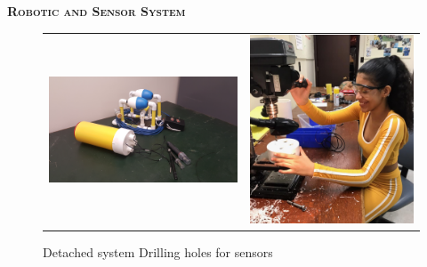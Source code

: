 \documentclass[final,t]{beamer}
\begin{document}
\begin{frame}{}
\begin{columns}
\begin{column}{.34\linewidth}
\begin{alertblock}{\textsc{\textbf{Robotic and Sensor System}}}
                    \begin{center}
                    \begin{figure}
                    \begin{tabular}{cc}
                    \includegraphics[scale = 0.16]{assets/robot1}
                    \hspace*{5mm}
                    &
                    \includegraphics[scale = 0.39]{assets/meworking1}
                    \end{tabular}
                    \caption{Detached system \hspace{30mm} Drilling holes for sensors}
                    \end{figure}
                    \end{center}


\end{alertblock}
\end{column}
\end{columns}
\end{frame}
\end{document}
